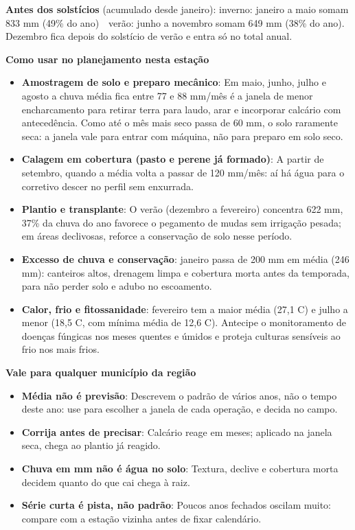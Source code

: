 \documentclass[10pt,a4paper]{article}
\begin{document}
\vspace{1pt}
{\footnotesize\textbf{Antes dos solstícios} (acumulado desde janeiro):
inverno: janeiro a maio somam 833 mm (49\% do ano) \,\textbullet\, verão: junho a novembro somam 649 mm (38\% do ano). Dezembro fica depois do solstício de verão e entra só no total
anual.}

\vspace{2pt}
{\bfseries\small Como usar no planejamento nesta estação}

\footnotesize\begin{itemize}\setlength{\itemsep}{0.5pt}
  \item \textbf{Amostragem de solo e preparo mecânico}: Em maio, junho, julho e agosto a chuva média fica entre 77 e 88 mm/mês \textemdash{} é a janela de menor encharcamento para retirar terra para laudo, arar e incorporar calcário com antecedência. Como até o mês mais seco passa de 60 mm, o solo raramente seca: a janela vale para entrar com máquina, não para preparo em solo seco.
  \item \textbf{Calagem em cobertura (pasto e perene já formado)}: A partir de setembro, quando a média volta a passar de 120 mm/mês: aí há água para o corretivo descer no perfil sem enxurrada.
  \item \textbf{Plantio e transplante}: O verão (dezembro a fevereiro) concentra 622 mm, 37\% da chuva do ano \textemdash{} favorece o pegamento de mudas sem irrigação pesada; em áreas declivosas, reforce a conservação de solo nesse período.
  \item \textbf{Excesso de chuva e conservação}: janeiro passa de 200 mm em média (246 mm): canteiros altos, drenagem limpa e cobertura morta antes da temporada, para não perder solo e adubo no escoamento.
  \item \textbf{Calor, frio e fitossanidade}: fevereiro tem a maior média (27,1 \textdegree{}C) e julho a menor (18,5 \textdegree{}C, com mínima média de 12,6 \textdegree{}C). Antecipe o monitoramento de doenças fúngicas nos meses quentes e úmidos e proteja culturas sensíveis ao frio nos mais frios.
\end{itemize}

\vspace{1pt}
{\bfseries\small Vale para qualquer município da região}

\scriptsize\begin{itemize}\setlength{\itemsep}{0.5pt}
  \item \textbf{Média não é previsão}: Descrevem o padrão de vários anos, não o tempo deste ano: use para escolher a janela de cada operação, e decida no campo.
  \item \textbf{Corrija antes de precisar}: Calcário reage em meses; aplicado na janela seca, chega ao plantio já reagido.
  \item \textbf{Chuva em mm não é água no solo}: Textura, declive e cobertura morta decidem quanto do que cai chega à raiz.
  \item \textbf{Série curta é pista, não padrão}: Poucos anos fechados oscilam muito: compare com a estação vizinha antes de fixar calendário.
\end{itemize}
\end{document}
